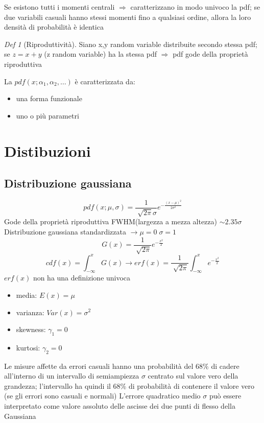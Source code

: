 \documentclass[12pt]{report}
\theoremstyle{remark}
\theoremstyle{theorem}
\newtheorem*{Def}{Def}
\begin{document}
\noindent Se esistono tutti i momenti centrali $\Rightarrow$ caratterizzano in modo univoco la pdf; se due variabili casuali hanno stessi momenti fino a qualsiasi ordine, allora la loro densità di probabilità è identica

\begin{Def}[Riproduttività]
	Siano x,y random variable distribuite secondo stessa pdf; se $z=x+y$ (z random variable) ha la stessa pdf $\Rightarrow$ pdf gode della proprietà riproduttiva
\end{Def}

\noindent La $pdf(x;\alpha_1,\alpha_2,\dots)$ è caratterizzata da:
\begin{itemize}
	\item una forma funzionale 
	\item uno o più parametri
\end{itemize} 

\section{Distibuzioni}
\subsection*{Distribuzione gaussiana}
\[pdf(x;\mu,\sigma) = \frac{1}{\sqrt[]{2\pi}\sigma} e^{-\frac{{(x-\mu)}^2}{2\sigma^2}}\]
Gode della proprietà riproduttiva \newline
FWHM(largezza a mezza altezza) $\sim 2.35\sigma$ \newline
Distribuzione gaussiana standardizzata  $\to \mu=0 \; \sigma=1$
\[G(x) = \frac{1}{\sqrt[]{2\pi}}e^{-\frac{x^2}{2}}\]
\[cdf(x) = \int_{-\infty}^x G(x) \to erf(x) = \frac{1}{\sqrt[]{2\pi}} \int_{-\infty}^x e^{-\frac{x^2}{2}}\]
$erf(x)$ non ha una definizione univoca
\begin{itemize}
	\item media: \; $E(x)=\mu$
	\item varianza: \; $Var(x)=\sigma^2$
	\item skewness: \; $\gamma_1=0$
	\item kurtosi: \; $\gamma_2=0$
\end{itemize}

\noindent Le misure affette da errori casuali hanno una probabilità del 68\% di cadere all'interno di un intervallo di semiampiezza $\sigma$ centrato sul valore vero della grandezza; l'intervallo ha quindi il 68\% di probabilità di contenere il valore vero (se gli errori sono casuali e normali) \newline
L'errore quadratico medio $\sigma$ può essere interpretato come valore assoluto delle ascisse dei due punti di flesso della Gaussiana 
\end{document}

